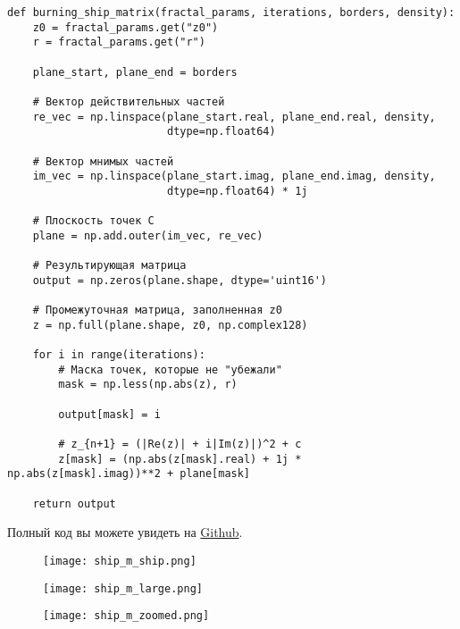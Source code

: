 \documentclass[a4paper,12pt]{article}
\begin{document}
\clearpage

\begin{lstlisting}[caption={Функция для построения множества "Горящий корабль"}, label={lst:burning_ship}]
def burning_ship_matrix(fractal_params, iterations, borders, density):
    z0 = fractal_params.get("z0")
    r = fractal_params.get("r")
    
    plane_start, plane_end = borders
    
    # Вектор действительных частей
    re_vec = np.linspace(plane_start.real, plane_end.real, density,
                         dtype=np.float64)
    
    # Вектор мнимых частей
    im_vec = np.linspace(plane_start.imag, plane_end.imag, density,
                         dtype=np.float64) * 1j
                         
    # Плоскость точек C
    plane = np.add.outer(im_vec, re_vec)
    
    # Результирующая матрица
    output = np.zeros(plane.shape, dtype='uint16')
    
    # Промежуточная матрица, заполненная z0
    z = np.full(plane.shape, z0, np.complex128)
    
    for i in range(iterations):
        # Маска точек, которые не "убежали"
        mask = np.less(np.abs(z), r)
        
        output[mask] = i
        
        # z_{n+1} = (|Re(z)| + i|Im(z)|)^2 + c
        z[mask] = (np.abs(z[mask].real) + 1j * np.abs(z[mask].imag))**2 + plane[mask]
        
    return output
\end{lstlisting}
Полный код вы можете увидеть на \href{https://github.com/Axe-On-You/tfkp-lab1}{Github}.

\clearpage

\begin{figure}[h!]
    \centering
    \texttt{[image: ship\_m\_ship.png]}
    
    \vspace{0.5cm}
    
    \texttt{[image: ship\_m\_large.png]}
\end{figure}

\clearpage

\begin{figure}[h!]
    \centering
    \texttt{[image: ship\_m\_zoomed.png]} 
\end{figure}
\end{document}

